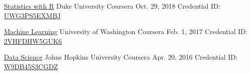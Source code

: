 
\begin{cventries}

\cventry
    {\href{https://www.coursera.org/account/accomplishments/specialization/2VHFDHW5GUK6}{Statistics with R}} %
    {Duke University} %
    {Coursera} %
    {Oct. 29, 2018} %
    {
      Credential ID: \href{https://www.coursera.org/account/accomplishments/specialization/UWG3PS5EXMBJ}{UWG3PS5EXMBJ}
    }

\cventry
    {\href{https://www.coursera.org/account/accomplishments/specialization/2VHFDHW5GUK6}{Machine Learning}} %
    {University of Washington} %
    {Coursera} %
    {Feb. 1, 2017} %
    {
      Credential ID: \href{https://www.coursera.org/account/accomplishments/specialization/2VHFDHW5GUK6}{2VHFDHW5GUK6}
    }

\cventry
    {\href{https://www.coursera.org/account/accomplishments/specialization/W9DB45S3CGDZ}{Data Science}} %
    {Johns Hopkins University} %
    {Coursera} %
    {Apr. 20, 2016} %
    {
      Credential ID: \href{https://www.coursera.org/account/accomplishments/specialization/W9DB45S3CGDZ}{W9DB45S3CGDZ}
    }

\end{cventries}